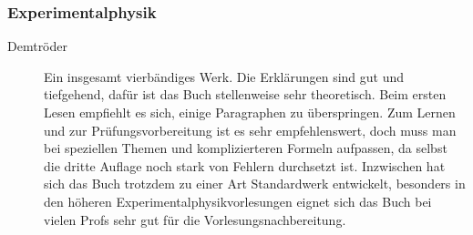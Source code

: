 \subsubsection{Experimentalphysik}
\begin{description}




\item[Demtröder]{
Ein insgesamt vierbändiges Werk. Die Erklärungen sind gut und
tiefgehend, dafür ist das Buch stellenweise sehr theoretisch. Beim
ersten
Lesen empfiehlt es sich, einige Paragraphen zu überspringen. Zum Lernen
und zur Prüfungsvorbereitung ist es sehr empfehlenswert, doch muss
man bei
speziellen Themen und komplizierteren Formeln aufpassen, da selbst die
dritte
Auflage noch stark von Fehlern durchsetzt ist. Inzwischen hat sich das
Buch
trotzdem zu einer Art Standardwerk entwickelt, besonders in den höheren
Experimentalphysikvorlesungen eignet sich das Buch bei vielen Profs
sehr gut
für die Vorlesungsnachbereitung.}



\end{description}
